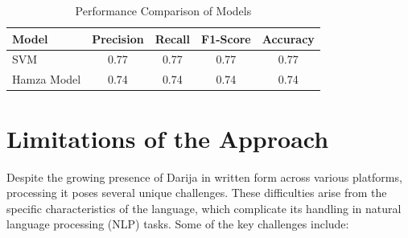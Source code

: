 \documentclass[a4paper,40pt,twocolumn]{article}
\begin{document}
\begin{table}[H]
\captionsetup{type=figure} 
\centering
\scriptsize
\begin{tabular}{lcccc}
\hline
\textbf{Model} & \textbf{Precision} & \textbf{Recall} & \textbf{F1-Score} & \textbf{Accuracy} \\ \hline
SVM            & 0.77              & 0.77            & 0.77              & 0.77             \\ 
Hamza Model    & 0.74              & 0.74            & 0.74              & 0.74             \\ \hline
\end{tabular}
\caption{Performance Comparison of Models}
\label{fig:benchmark}
\end{table}







\section{Limitations of the Approach}
Despite the growing presence of Darija in written form across various platforms, processing it poses several unique challenges. These difficulties arise from the specific characteristics of the language, which complicate its handling in natural language processing (NLP) tasks. Some of the key challenges include:
\end{document}
